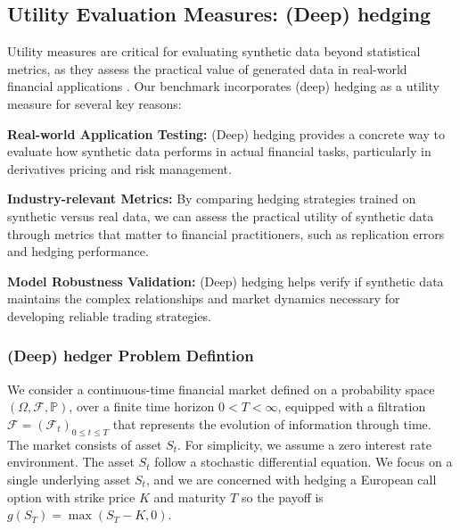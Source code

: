 \documentclass[sigconf]{acmart}
\begin{document}
  \subsection{Utility Evaluation Measures: (Deep) hedging}
    Utility measures are critical for evaluating synthetic data 
    beyond statistical metrics, as they assess the practical value 
    of generated data in real-world financial applications 
    \cite{Boursin22}. Our benchmark incorporates (deep) hedging as a 
    utility measure for several key reasons:

    \begin{enumerate}[label=\textbf{[U\arabic*]}]
      \item \label{utility:application}\textbf{Real-world 
      Application Testing:}
      (Deep) hedging provides a concrete way to evaluate how 
      synthetic data performs in actual financial tasks, 
      particularly in derivatives pricing and risk management.

      \item \label{utility:industry}\textbf{Industry-relevant 
      Metrics:}
      By comparing hedging strategies trained on synthetic versus 
      real data, we can assess the practical utility of synthetic 
      data through metrics that matter to financial practitioners, 
      such as replication errors and hedging performance.

      \item \label{utility:validation}\textbf{Model Robustness 
      Validation:}
      (Deep) hedging helps verify if synthetic data maintains the 
      complex relationships and market dynamics necessary for 
      developing reliable trading strategies.
    \end{enumerate}

    \subsubsection{(Deep) hedger Problem Defintion}
      We consider a continuous-time financial market defined on a 
      probability space $(\Omega, \mathcal{F}, \mathbb{P})$, over 
      a finite time horizon $0 < T < \infty$, equipped with a 
      filtration $\mathcal{F} = (\mathcal{F}_t)_{0 \leq t \leq T}$ 
      that represents the evolution of information through time.  
      The market consists of asset $S_t$. For simplicity, we assume a zero 
      interest rate environment.
      The asset \(S_t\) follow a stochastic differential
      equation. We focus on a single underlying asset \(S_t\), and we are
      concerned with hedging a European call option with strike price \(K\)
      and maturity \(T\) so the payoff is \(g(S_T) = \max(S_T - K, 0)\).
\end{document}
